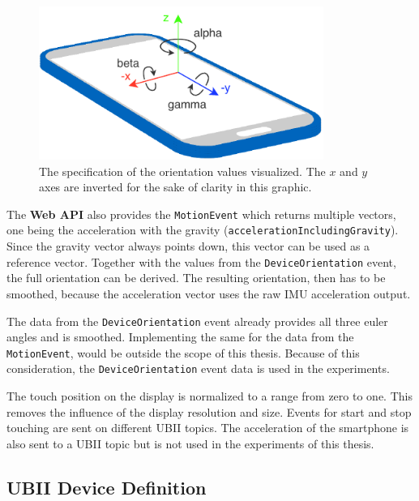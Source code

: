 \begin{figure}[htpb]
  \centering
  \includegraphics[height=5cm]{figures/implementation/webapi_device_orientation.pdf}
  \caption[Device coordinate system and orientation values]{The specification of the orientation values visualized. The \(x\) and \(y\) axes are inverted for the sake of clarity in this graphic.}\label{fig:webapi-device-orientation}
\end{figure}

The \textbf{Web API} also provides the \lstinline{MotionEvent} which returns multiple vectors, one being the acceleration with the gravity (\lstinline{accelerationIncludingGravity}). Since the gravity vector always points down, this vector can be used as a reference vector. Together with the values from the \lstinline{DeviceOrientation} event, the full orientation can be derived. The resulting orientation, then has to be smoothed, because the acceleration vector uses the raw \ac{IMU} acceleration output. %

The data from the \lstinline{DeviceOrientation} event already provides all three euler angles and is smoothed. Implementing the same for the data from the \lstinline{MotionEvent}, would be outside the scope of this thesis. Because of this consideration, the \lstinline{DeviceOrientation} event data is used in the experiments. %

The touch position on the display is normalized to a range from zero to one. This removes the influence of the display resolution and size. Events for start and stop touching are sent on different \ac{UBII} topics. The acceleration of the smartphone is also sent to a \ac{UBII} topic but is not used in the experiments of this thesis. %


\subsection{UBII Device Definition}\label{subsection:ubii-device-definition}

